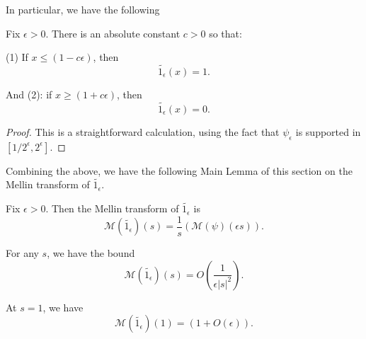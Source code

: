 In particular, we have the following
\begin{lemma}\label{Smooth1Properties}
Fix $\epsilon>0$. There is an absolute constant $c>0$ so that:

(1) If $x\leq (1-c\epsilon)$, then
$$\widetilde{1_{\epsilon}}(x) = 1.$$

And (2):
if $x\geq (1+c\epsilon)$, then
$$\widetilde{1_{\epsilon}}(x) = 0.$$
\end{lemma}



\begin{proof}
This is a straightforward calculation, using the fact that $\psi_\epsilon$ is supported in $[1/2^\epsilon,2^\epsilon]$.
\end{proof}



Combining the above, we have the following Main Lemma of this section on the Mellin transform of $\widetilde{1_{\epsilon}}$.
\begin{lemma}\label{MellinOfSmooth1}
Fix  $\epsilon>0$. Then the Mellin transform of $\widetilde{1_{\epsilon}}$ is
$$\mathcal{M}(\widetilde{1_{\epsilon}})(s) = \frac{1}{s}\left(\mathcal{M}(\psi)\left(\epsilon s\right)\right).$$

For any $s$, we have the bound
$$\mathcal{M}(\widetilde{1_{\epsilon}})(s) = O\left(\frac{1}{\epsilon|s|^2}\right).$$

At $s=1$, we have
$$\mathcal{M}(\widetilde{1_{\epsilon}})(1) = (1+O(\epsilon)).$$
\end{lemma}


